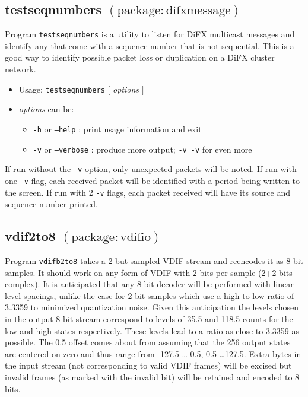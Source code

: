 \subsection{testseqnumbers {\small $\mathrm{(package: difxmessage)}$}} \label{sec:testsequnumbers} 

Program {\tt testseqnumbers} is a utility to listen for DiFX multicast messages and identify any that come with a sequence number that is not sequential.
This is a good way to identify possible packet loss or duplication on a DiFX cluster network.

\begin{itemize}
\item[] Usage: {\tt testseqnumbers} $[$ {\em options} $]$
\item[] {\em options} can be:
\begin{itemize}
\item[] {\tt -h} or {\tt --help} : print usage information and exit
\item[] {\tt -v} or {\tt --verbose} : produce more output; {\tt -v -v} for even more
\end{itemize}
\end{itemize}

If run without the {\tt -v} option, only unexpected packets will be noted.
If run with one {\tt -v} flag, each received packet will be identified with a period being written to the screen.
If run with 2 {\tt -v} flags, each packet received will have its source and sequence number printed.







\subsection{vdif2to8 {\small $\mathrm{(package: vdifio)}$}} \label{sec:vdif2to8}

Program {\tt vdifb2to8} takes a 2-but sampled VDIF stream and reencodes it as 8-bit samples.
It should work on any form of VDIF with 2 bits per sample (2+2 bits complex).
It is anticipated that any 8-bit decoder will be performed with linear level spacings, unlike the case for 2-bit samples which use a high to low ratio of 3.3359 to minimized quantization noise.
Given this anticipation the levels chosen in the output 8-bit stream correspond to levels of 35.5 and 118.5 counts for the low and high states respectively.
These levels lead to a ratio as close to 3.3359 as possible.
The 0.5 offset comes about from assuming that the 256 output states are centered on zero and thus range from -127.5 \ldots -0.5, 0.5 \ldots 127.5.
Extra bytes in the input stream (not corresponding to valid VDIF frames) will be excised but invalid frames (as marked with the invalid bit) will be retained and encoded to 8 bits.

